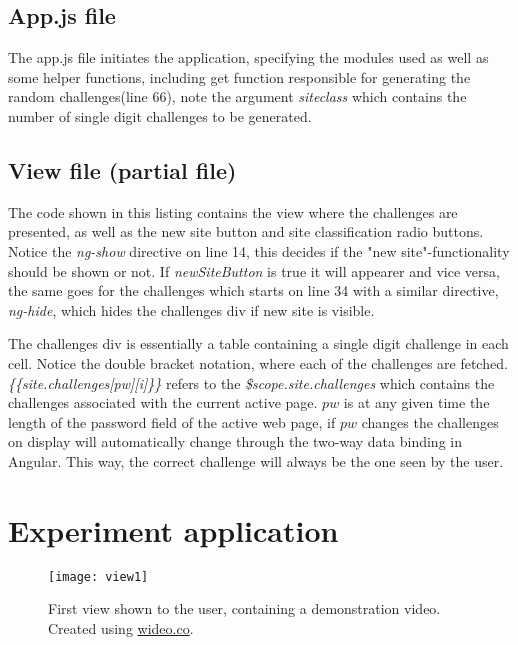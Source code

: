 \section{App.js file}\label{app:app.js}


The app.js file initiates the application, specifying the modules used as well as some helper functions, including get function responsible for generating the random challenges(line 66), note the argument \emph{siteclass} which contains the number of single digit challenges to be generated. 

\section{View file (partial file)}\label{app:view}

The code shown in this listing contains the view where the challenges are presented, as well as the new site button and site classification radio buttons. Notice the \emph{ng-show} directive on line 14, this decides if the "new site"-functionality should be shown or not. If \emph{newSiteButton} is true it will appearer and vice versa, the same goes for the challenges which starts on line 34 with a similar directive, \emph{ng-hide}, which hides the challenges div if new site is visible.  
\par The challenges div is essentially a table containing a single digit challenge in each cell. Notice the double bracket notation, where each of the challenges are fetched. \emph{\{\{site.challenges[pw][i]\}\}} refers to the \emph{\$scope.site.challenges} which contains the challenges associated with the current active page. $pw$ is at any given time the length of the password field of the active web page, if $pw$ changes the challenges on display will automatically change through the two-way data binding in Angular. This way, the correct challenge will always be the one seen by the user.


\chapter{Experiment application}\label{experiment-views}

\begin{figure}
    \texttt{[image: view1]}
    \caption{First view shown to the user, containing a demonstration video. Created using \url{wideo.co}.}
    \label{view1}
\end{figure}

